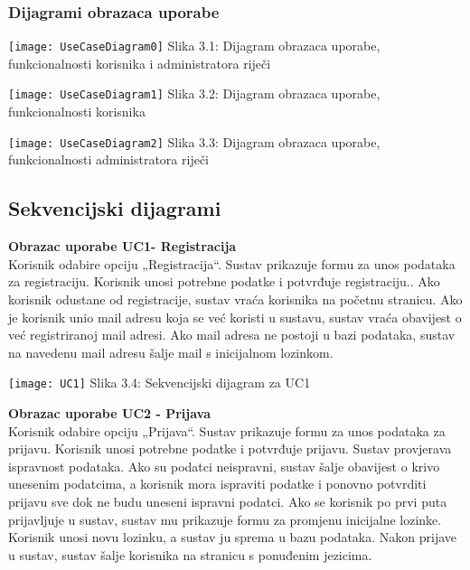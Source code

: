 				
					
				\subsubsection{Dijagrami obrazaca uporabe}
					

					\texttt{[image: UseCaseDiagram0]}
					Slika 3.1: Dijagram obrazaca uporabe, funkcionalnosti korisnika i administratora riječi
					
					\texttt{[image: UseCaseDiagram1]}
					Slika 3.2: Dijagram obrazaca uporabe, funkcionalnosti korisnika
					
					\texttt{[image: UseCaseDiagram2]}
					Slika 3.3: Dijagram obrazaca uporabe, funkcionalnosti administratora riječi\newpage
				
			\subsection{Sekvencijski dijagrami}
				
%				
				
				\textbf{Obrazac uporabe UC1- Registracija}\\
				Korisnik odabire opciju „Registracija“. Sustav prikazuje formu za unos podataka za registraciju. Korisnik unosi potrebne podatke i potvrđuje registraciju.. Ako korisnik odustane od registracije, sustav vraća korisnika na početnu stranicu. Ako je korisnik unio mail adresu koja se već koristi u sustavu, sustav vraća obavijest o već registriranoj mail adresi. Ako mail adresa ne postoji u bazi podataka, sustav na navedenu mail adresu šalje mail s inicijalnom lozinkom.\newpage

				\texttt{[image: UC1]}
				Slika 3.4: Sekvencijski dijagram za UC1\newpage
				
				
				\noindent\textbf{Obrazac uporabe UC2 - Prijava}\\
				Korisnik odabire opciju „Prijava“. Sustav prikazuje formu za unos podataka za prijavu. Korisnik unosi potrebne podatke i potvrđuje prijavu. Sustav provjerava ispravnost podataka. Ako su podatci neispravni, sustav šalje obavijest o krivo unesenim podatcima, a korisnik mora ispraviti podatke i ponovno potvrditi prijavu sve dok ne budu uneseni ispravni podatci. Ako se korisnik po prvi puta prijavljuje u sustav, sustav mu prikazuje formu za promjenu inicijalne lozinke. Korisnik unosi novu lozinku, a sustav ju sprema u bazu podataka. Nakon prijave u sustav, sustav šalje korisnika na stranicu s ponuđenim jezicima.
				
